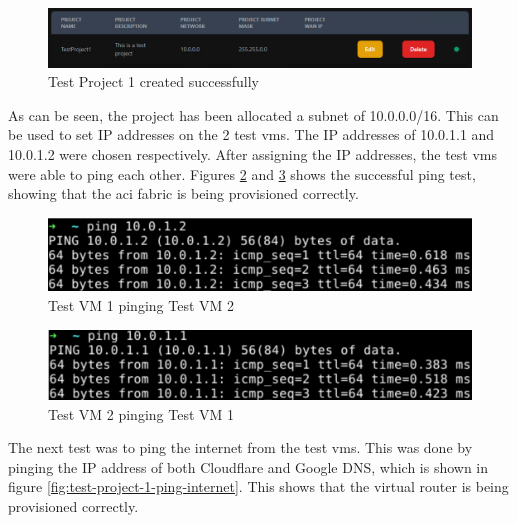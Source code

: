 \begin{figure}[H]
    \centering
    \includegraphics[scale=0.8]{images/test-project-1.png}
    \caption{Test Project 1 created successfully}
    \label{fig:test-project-1}
\end{figure}

As can be seen, the project has been allocated a subnet of 10.0.0.0/16. This can be used to set IP addresses on the 2 test \gls{vm}s. The IP addresses of 10.0.1.1 and 10.0.1.2 were chosen respectively. After assigning the IP addresses, the test \gls{vm}s were able to ping each other. Figures \ref{fig:test-project-1-ping-1} and \ref{fig:test-project-1-ping-2} shows the successful ping test, showing that the \gls{aci} fabric is being provisioned correctly.

\begin{figure}[H]
    \centering
    \includegraphics[scale=0.7]{images/test-project-1-ping.png}
    \caption{Test VM 1 pinging Test VM 2}
    \label{fig:test-project-1-ping-1}
\end{figure}

\begin{figure}[H]
    \centering
    \includegraphics[scale=0.7]{images/test-project-1-ping-2.png}
    \caption{Test VM 2 pinging Test VM 1}
    \label{fig:test-project-1-ping-2}
\end{figure}

The next test was to ping the internet from the test \gls{vm}s. This was done by pinging the IP address of both Cloudflare and Google DNS, which is shown in figure \ref{fig:test-project-1-ping-internet}. This shows that the virtual router is being provisioned correctly.

